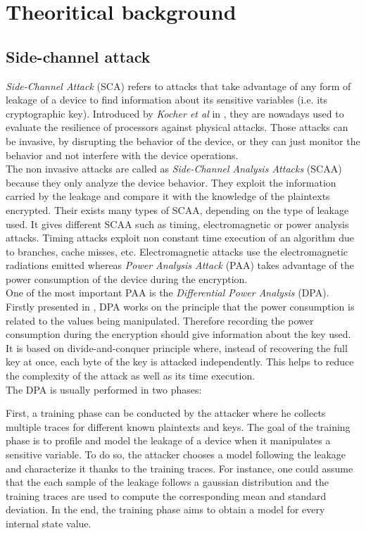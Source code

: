 \section{Theoritical background}\label{Theory}
\subsection{Side-channel attack}
\textit{Side-Channel Attack} (SCA) refers to attacks that take advantage 
of any form of leakage of a device to find information about its sensitive 
variables (i.e. its cryptographic key). Introduced by \textit{Kocher et 
al} in \cite{KocherDPA}, they are nowadays used to evaluate the resilience 
of processors against physical attacks. Those attacks can be invasive, by 
disrupting the behavior of the device, or they can just monitor the 
behavior and not interfere with the device operations. \\

The non invasive attacks are called as \textit{Side-Channel Analysis 
Attacks} (SCAA) because they only analyze the device behavior. They 
exploit the information carried by the leakage and compare it with the 
knowledge of the plaintexts encrypted. Their exists many types of SCAA, 
depending on the type of leakage used. It gives different SCAA such as 
timing, electromagnetic or power analysis attacks. Timing attacks 
\cite{KocherTiming,} exploit non constant time execution of an algorithm 
due to branches, cache misses, etc. Electromagnetic attacks 
\cite{electromagnetic} use the electromagnetic radiations emitted whereas 
\textit{Power Analysis Attack} (PAA) takes advantage of the power 
consumption of the device during the encryption.\\

One of the most important PAA is the \textit{Differential Power Analysis} 
(DPA). Firstly presented in \cite{KocherDPA}, DPA works on the principle 
that the power consumption is related to the values being manipulated. 
Therefore recording the power consumption during the encryption should 
give information about the key used. It is based on divide-and-conquer 
principle where, instead of recovering the full key at once, each byte of 
the key is attacked independently. This helps to reduce the complexity of 
the attack as well as its time execution. \\

The DPA is usually performed in two phases:

First, a training phase can be conducted by the attacker where he collects 
multiple traces for different known plaintexts and keys. The goal of the 
training phase is to profile and model the leakage of a device when it 
manipulates a sensitive variable.  To do so, the attacker chooses a model 
following the leakage and characterize it thanks to the training traces. 
For instance, one could assume that the each sample of the leakage follows 
a gaussian distribution and the training traces are used to compute the 
corresponding mean and standard deviation. In the end, the training phase 
aims to obtain a model for every internal state value. 

